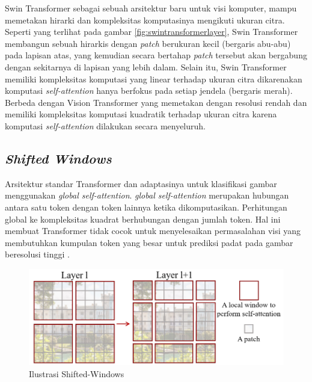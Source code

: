 Swin Transformer sebagai sebuah arsitektur baru untuk visi komputer, mampu \linebreak memetakan hirarki dan kompleksitas komputasinya mengikuti ukuran citra. Seperti yang 
terlihat pada gambar \ref{fig:swintransformerlayer}, Swin Transformer membangun sebuah hirarkis dengan \emph{patch} berukuran kecil (bergaris abu-abu) pada lapisan atas, yang kemudian secara 
bertahap \emph{patch} tersebut akan bergabung dengan sekitarnya di lapisan yang lebih dalam. Selain itu, Swin Transformer memiliki kompleksitas komputasi yang linear 
terhadap ukuran citra dikarenakan komputasi \emph{self-attention} hanya berfokus pada setiap jendela (bergaris merah). Berbeda dengan Vision Transformer yang 
memetakan dengan resolusi rendah dan memiliki kompleksitas komputasi kuadratik terhadap ukuran citra karena komputasi \emph{self-attention} dilakukan secara 
menyeluruh. \parencite{Liu2021}

\subsection{\emph{Shifted Windows}}

Arsitektur standar Transformer dan adaptasinya untuk klasifikasi gambar menggunakan \emph{global self-attention}. \emph{global self-attention} merupakan hubungan antara 
satu token dengan token lainnya ketika dikomputasikan. Perhitungan global ke kompleksitas kuadrat berhubungan dengan jumlah token. Hal ini membuat Transformer tidak cocok 
untuk menyelesaikan \linebreak permasalahan visi yang membutuhkan kumpulan token yang besar untuk prediksi padat pada gambar beresolusi tinggi \parencite{Liu2021}.

\begin{figure}[h!]
  \centering
  \includegraphics[scale=0.7]{gambar/Ilustrasi Shifted Windows.png}
  \caption{Ilustrasi Shifted-Windows}
  \label{fig:ilustrasishiftedwindows}
\end{figure}

